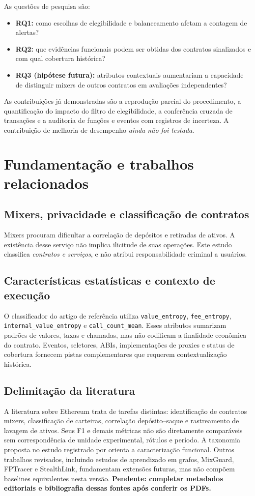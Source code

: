 \documentclass[11pt,a4paper]{article}
\begin{document}
As questões de pesquisa são:
\begin{itemize}
 \item \textbf{RQ1:} como escolhas de elegibilidade e balanceamento afetam a contagem de alertas?
 \item \textbf{RQ2:} que evidências funcionais podem ser obtidas dos contratos sinalizados e com qual cobertura histórica?
 \item \textbf{RQ3 (hipótese futura):} atributos contextuais aumentariam a capacidade de distinguir mixers de outros contratos em avaliações independentes?
\end{itemize}

As contribuições já demonstradas são a reprodução parcial do procedimento, a quantificação do impacto do filtro de elegibilidade, a conferência cruzada de transações e a auditoria de funções e eventos com registros de incerteza. A contribuição de melhoria de desempenho \emph{ainda não foi testada}.

\section{Fundamentação e trabalhos relacionados}
\subsection{Mixers, privacidade e classificação de contratos}
Mixers procuram dificultar a correlação de depósitos e retiradas de ativos. A existência desse serviço não implica ilicitude de suas operações. Este estudo classifica \emph{contratos e serviços}, e não atribui responsabilidade criminal a usuários.

\subsection{Características estatísticas e contexto de execução}
O classificador do artigo de referência utiliza \texttt{value\_entropy}, \texttt{fee\_entropy}, \texttt{internal\_value\_\allowbreak entropy} e \texttt{call\_count\_mean}. Esses atributos sumarizam padrões de valores, taxas e chamadas, mas não codificam a finalidade econômica do contrato. Eventos, seletores, ABIs, implementações de proxies e status de cobertura fornecem pistas complementares que requerem contextualização histórica.

\subsection{Delimitação da literatura}
A literatura sobre Ethereum trata de tarefas distintas: identificação de contratos mixers, classificação de carteiras, correlação depósito--saque e rastreamento de lavagem de ativos. Seus F1 e demais métricas não são diretamente comparáveis sem correspondência de unidade experimental, rótulos e período. A taxonomia proposta no estudo registrado por \citep{barbereau2023taxonomy} orienta a caracterização funcional. Outros trabalhos revisados, incluindo estudos de aprendizado em grafos, MixGuard, FPTracer e StealthLink, fundamentam extensões futuras, mas não compõem baselines equivalentes nesta versão. \textbf{Pendente: completar metadados editoriais e bibliografia dessas fontes após conferir os PDFs.}
\end{document}
